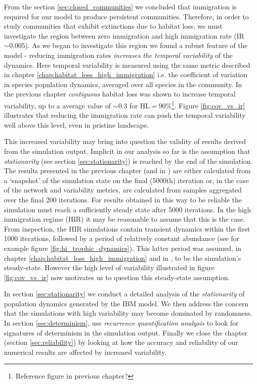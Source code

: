 From the section \ref{sec:closed_communities} we concluded that immigration is required for our model to produce persistent communities. Therefore, in order to study communities that exhibit extinctions due to habitat loss, we must investigate the region between zero immigration and high immigration rate (IR$\sim 0.005$). As we began to investigate this region we found a robust feature of the model - reducing immigration rates \emph{increases the temporal variability} of the dynamics. Here temporal variability is measured using the same metric described in chapter \ref{chap:habitat_loss_high_immigration} i.e. the coefficient of variation in species population dynamics, averaged over all species in the community. In the previous chapter \emph{contiguous} habitat loss was shown to increase temporal variability, up to a average value of $\sim 0.3$ for HL$=90\%$\footnote{Reference figure in previous chapter?}. Figure \ref{fig:cov_vs_ir} illustrates that reducing the immigration rate can push the temporal variability well above this level, even in pristine landscape. 


This increased variability may bring into question the validity of results derived from the simulation output. Implicit in our analysis so far is the assumption that \emph{stationarity} (see section \ref{sec:stationarity}) is reached by the end of the simulation. The results presented in the previous chapter (and in \cite{lurgi2015effects}) are either calculated from a `snapshot' of the simulation state on the final (5000th) iteration or, in the case of the network and variability metrics, are calculated from samples aggregated over the final 200 iterations. For results obtained in this way to be reliable the simulation must reach a sufficiently steady state after 5000 iterations. In the high immigration regime (HIR) it may be reasonable to assume that this is the case. From inspection, the HIR simulations contain transient dynamics within the first 1000 iterations, followed by a period of relatively constant abundance (see for example figure \ref{fig:hi_trophic_dynamics}). This latter period was assumed, in chapter \ref{chap:habitat_loss_high_immigration} and in \cite{lurgi2015effects}, to be the simulation's steady-state. However the high level of variability illustrated in figure \ref{fig:cov_vs_ir} now motivates us to question this steady-state assumption. 

In section \ref{sec:stationarity} we conduct a detailed analysis of the \emph{stationarity} of population dynamics generated by the IBM model. We then address the concern that the simulations with high variability may become dominated by randomness. In section \ref{sec:determinism}, use \emph{recurrence quantification analysis} to look for signatures of determinism in the simulation output. Finally we close the chapter (section \ref{sec:reliability}) by looking at how the accuracy and reliability of our numerical results are affected by increased variability.
 
